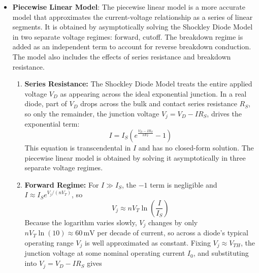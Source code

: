 \begin{enumerate}
\begin{itemize}
\begin{itemize}
          \item \(n\) is the ideality factor (typically between 1
            and 2).
          \item \(V_T\) is the thermal voltage, given by \(V_T = \frac{kT}{q}\).
        \end{itemize}
        This model does not account for the reverse breakdown conduction of
        the diode, nor does it account for the series or breakdown resistance
        of the diode.
      \item \textbf{Piecewise Linear Model}: The piecewise linear model
        is a more accurate model that approximates the current-voltage
        relationship as a series of linear segments. It is obtained by
        asymptotically solving the Shockley Diode Model in two separate
        voltage regimes: forward, cutoff. The breakdown regime is added as
        an independent term to account for reverse breakdown conduction.
        The model also includes the effects of series resistance and breakdown
        resistance.
        \begin{enumerate}
          \item \textbf{Series Resistance:}
            The Shockley Diode Model treats the entire applied voltage \(V_D\)
            as appearing across the ideal exponential junction. In a real diode,
            part of \(V_D\) drops across the bulk and contact series resistance
            \(R_S\), so only the remainder, the junction voltage
            \(V_j = V_D - I R_S\), drives the exponential term:
            \[
              I = I_S \left( e^{\frac{V_D - I R_S}{n V_T}} - 1 \right)
            \]
            This equation is transcendental in \(I\) and has no closed-form
            solution. The piecewise linear model is obtained by solving it
            asymptotically in three separate voltage regimes.
          \item \textbf{Forward Regime:}
            For \(I \gg I_S\), the \(-1\) term is negligible and
            \(I \approx I_S e^{V_j / (nV_T)}\), so
            \[
              V_j \approx n V_T \ln\!\left(\frac{I}{I_S}\right)
            \]
            Because the logarithm varies slowly, \(V_j\) changes by only
            \(n V_T \ln(10) \approx 60\,\text{mV}\) per decade of current, so
            across a diode's typical operating range \(V_j\) is well
            approximated as constant. Fixing \(V_j \approx V_{TH}\), the
            junction voltage at some nominal operating current \(I_0\), and
            substituting into \(V_j = V_D - I R_S\) gives

\end{enumerate}
\end{itemize}
\end{enumerate}

